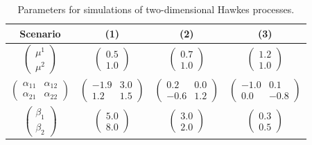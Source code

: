     \begin{table}[h!]
    \begin{center}  
        \centering
        \begin{tabular}{c|c|c|c}

             Scenario & (1) & (2) & (3) \\
             \toprule
             $\begin{pmatrix}
            \mu^1\\
            \mu^2
            \end{pmatrix}$ & $\begin{pmatrix}
            0.5\\
            1.0
            \end{pmatrix}$ & $\begin{pmatrix}
            0.7\\
            1.0
            \end{pmatrix}$&$\begin{pmatrix}
            1.2\\
            1.0
            \end{pmatrix}$\\\midrule
            $\begin{pmatrix}
            \alpha_{11} & \alpha_{12}\\
            \alpha_{21} & \alpha_{22}
            \end{pmatrix}$&$\begin{pmatrix}
            -1.9 & 3.0\\
            1.2 & 1.5
            \end{pmatrix}$&$\begin{pmatrix}
            0.2 & 0.0\\
            -0.6 & 1.2
            \end{pmatrix}$&$\begin{pmatrix}
            -1.0 & 0.1\\
            0.0 & -0.8
            \end{pmatrix}$\\\midrule
            $\begin{pmatrix}
            \beta_1\\
            \beta_2
            \end{pmatrix}$ & $\begin{pmatrix}
            5.0\\
            8.0
            \end{pmatrix}$ & $\begin{pmatrix}
            3.0\\
            2.0
            \end{pmatrix}$&$\begin{pmatrix}
            0.3\\
            0.5
            \end{pmatrix}$
        \end{tabular}
        \caption{Parameters for simulations of two-dimensional Hawkes processes.}
        \label{tab:chap2_simulated_2_table}
    \end{center}
    \end{table}


